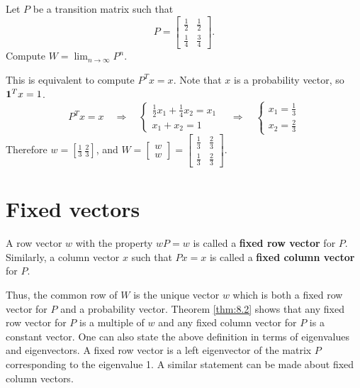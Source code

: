 \begin{example}
Let $P$ be a transition matrix such that 
\begin{equation*}
    P = \begin{bmatrix}  \frac{1}{2} & \frac{1}{2} \\ \frac{1}{4} & \frac{3}{4} \end{bmatrix}.
\end{equation*}
Compute $W = \lim_{n\to\infty} P^n$. 

This is equivalent to compute $P^T x = x$. Note that $x$ is a probability vector, so $\mathbf{1}^T x = 1$.
\begin{equation*}
    P^T x = x \quad \Rightarrow \quad \begin{cases} \frac{1}{2} x_1 + \frac{1}{4}x_2 = x_1 \\ x_1+x_2 = 1 \end{cases} \quad \Rightarrow \quad
    \begin{cases} x_1 = \frac{1}{3} \\ x_2 = \frac{2}{3} \end{cases}
\end{equation*}
Therefore $w = [\frac{1}{3} \ \frac{2}{3}]$, and $W = \begin{bmatrix} w \\ w \end{bmatrix} = \begin{bmatrix} \frac{1}{3} & \frac{2}{3} \\ \frac{1}{3} & \frac{2}{3} \end{bmatrix}$.
\end{example}

\section{Fixed vectors}
\begin{definition}
A row vector $w$ with the property $wP = w$ is called a \textbf{fixed row vector} for $P$. Similarly, a column vector $x$ such that $Px = x$ is called a \textbf{fixed column vector} for $P$.
\end{definition}

Thus, the common row of $W$ is the unique vector $w$ which is both a fixed row vector for $P$ and a probability vector. Theorem \ref{thm:8.2} shows that any fixed row vector for $P$ is a multiple of $w$ and any fixed column vector for $P$ is a constant vector. One can also state the above definition in terms of eigenvalues and eigenvectors. A fixed row vector is a left eigenvector of the matrix $P$ corresponding to the eigenvalue 1. A similar statement can be made about fixed column vectors.

